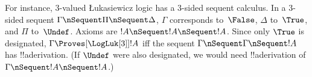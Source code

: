 \documentclass[../../../include/open-logic-section]{subfiles}
\begin{document}
For instance, $3$-valued \L ukasiewicz logic has a $3$-sided sequent
calculus. In a $3$-sided sequent $\Gamma \nSequent \Pi \nSequent
\Delta$, $\Gamma$ corresponds to~$\False$, $\Delta$ to~$\True$, and
$\Pi$ to~$\Undef$.  Axioms are $!A \nSequent !A \nSequent !A$. Since
only $\True$ is designated, $\Gamma \Proves[\LogLuk[3]] !A$ iff the
sequent $\Gamma \nSequent \Gamma \nSequent !A$ has !!a{derivation}.
(If $\Undef$ were also designated, we would need !!a{derivation} of
$\Gamma \nSequent !A \nSequent !A$.)
\end{document}

